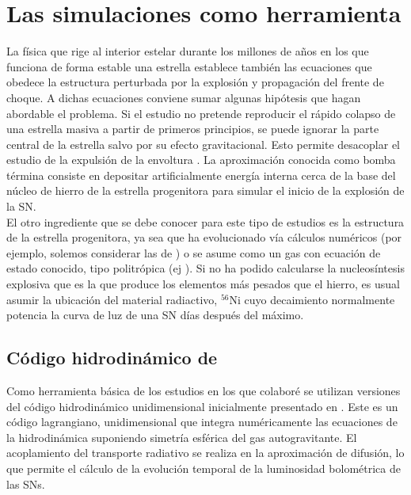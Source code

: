 \documentclass[baaa]{baaa}
\begin{document}


\section{Las simulaciones como herramienta}

La física que rige al interior estelar durante los millones de años en los que funciona de forma estable una estrella establece también las ecuaciones que obedece la estructura perturbada por la explosión y propagación del frente de choque. A dichas ecuaciones conviene sumar algunas hipótesis que hagan abordable el problema. Si el estudio no pretende reproducir el rápido colapso de una estrella masiva a partir de primeros principios, se puede ignorar la parte central de la estrella salvo por su efecto gravitacional.
Esto permite desacoplar el estudio de la expulsión de la envoltura \cite{1996Arnett}.
La aproximación conocida como bomba términa consiste en depositar artificialmente energía interna cerca de la base del núcleo de hierro de la estrella progenitora para simular el inicio de la explosión de la SN.\\

El otro ingrediente que se debe conocer para este tipo de estudios es la estructura de la estrella progenitora, ya sea que ha evolucionado vía cálculos numéricos (por ejemplo, solemos considerar las de \citealt{1988Ken}) o se asume como un gas con ecuación de estado conocido, tipo politrópica (ej \citealt{Martinez2019}). 
Si no ha podido calcularse la nucleosíntesis explosiva que es la que produce los elementos más pesados que el hierro, es usual asumir la ubicación del material radiactivo, $^{56}$Ni cuyo decaimiento normalmente potencia la curva de luz de una SN días después del máximo.\\

\subsection{Código hidrodinámico de \cite{Bersten2011}}
Como herramienta básica de los estudios en los que colaboré se utilizan versiones del código hidrodinámico unidimensional inicialmente presentado en \cite{Bersten2011}.
Este es un código lagrangiano, unidimensional que integra numéricamente las ecuaciones de la hidrodinámica suponiendo simetría esférica del gas autogravitante. El acoplamiento del transporte radiativo se realiza en la aproximación de difusión, lo que permite el cálculo de la evolución temporal de la luminosidad bolométrica de las SNs. 
\end{document}
